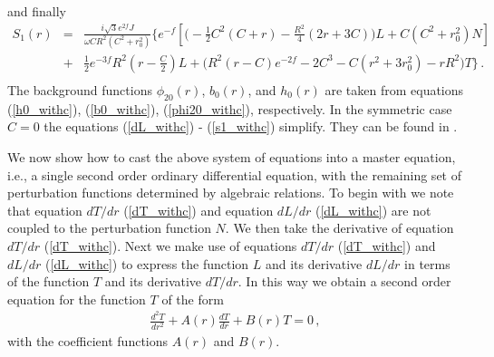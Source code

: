 \documentclass[aps,prd,12pt,superscriptaddress]{revtex4-2}
\begin{document}
and finally
\begin{eqnarray}
    S_1(r)
    &=& \frac{i\sqrt{3}e^{2f} J}
    {\omega CR^2 (C^2+r_0^2)}
    \big\{
    e^{-f}[
    \big(-\frac{1}{2}C^2(C+r)
    -\frac{R^2}{4}
    (2r+3C) \big) L
    + C(C^2+r_0^2)N
    ]
    \nonumber
    \\
    &+&
    \frac{1}{2}e^{-3f} R^2 (r-\frac{C}{2})  L
    +\big(R^2(r-C)e^{-2f}
    -2C^3
    -C(r^2+3r_0^2)
    -rR^2
    \big)T
    \big\}  \, .
    \nonumber \\
    \label{s1_withc}
\end{eqnarray}
The background functions $\phi_{20}(r)$, $b_0(r)$, and $h_0(r)$ 
are taken from equations (\ref{h0_withc}), (\ref{b0_withc}), (\ref{phi20_withc}), respectively.
In the symmetric case $C=0$ the equations (\ref{dL_withc}) - (\ref{s1_withc}) simplify.
They can be found in \cite{Azad:2023iju}.

We now show how to cast the above system of equations into a master equation, i.e., a single second order ordinary differential equation, with the remaining set of perturbation functions determined by algebraic relations.
To begin with we note that equation $dT/dr$ (\ref{dT_withc}) and equation $dL/dr$ (\ref{dL_withc}) are not coupled to the perturbation function $N$. 
We then take the derivative of equation $dT/dr$ (\ref{dT_withc}).
Next we make use of equations $dT/dr$ (\ref{dT_withc}) and $dL/dr$ (\ref{dL_withc}) to express the function $L$ and its derivative $dL/dr$ in terms of the function $T$ and its derivative $dT/dr$. 
In this way we obtain a second order equation for the function $T$ of the form
\begin{eqnarray}
\label{eqd2T}
\frac{d^2T}{dr^2}+ A(r)\frac{dT}{dr} + B(r)T = 0 \, ,
\end{eqnarray}
with the coefficient functions $A(r)$ and $B(r)$.
 
\end{document}
